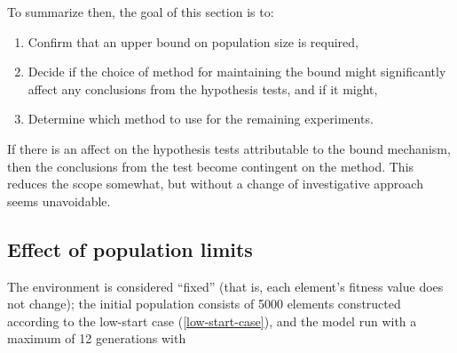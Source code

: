 To summarize then, the goal of this section is to:

\begin{enumerate}
	\item Confirm that an upper bound on population size is required,
	\item Decide if the choice of method for maintaining the bound might significantly affect any conclusions from the hypothesis tests, and if it might,
	\item Determine which method to use for the remaining experiments.
\end{enumerate}

If there is an affect on the hypothesis tests attributable to the bound mechanism, then the conclusions from the test become contingent on the method. This reduces the scope somewhat, but without a change of investigative approach seems unavoidable.

\subsection{Effect of population limits}



The environment is considered ``fixed'' (that is, each element's fitness value does not change); the initial population consists of 5000 elements constructed according to the low-start case (\cref{low-start-case}), and the model run with a maximum of 12 generations with

